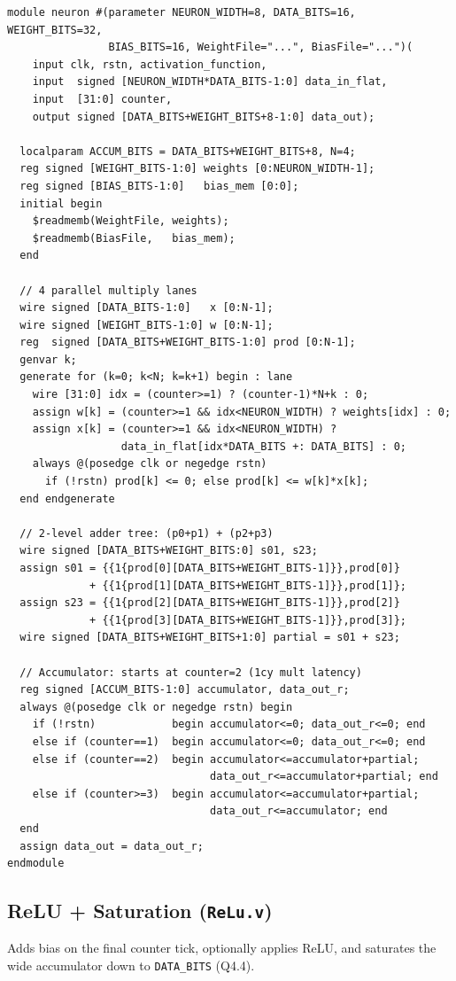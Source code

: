 \documentclass[10pt,a4paper]{article}
\begin{document}
\begin{lstlisting}
module neuron #(parameter NEURON_WIDTH=8, DATA_BITS=16, WEIGHT_BITS=32,
                BIAS_BITS=16, WeightFile="...", BiasFile="...")(
    input clk, rstn, activation_function,
    input  signed [NEURON_WIDTH*DATA_BITS-1:0] data_in_flat,
    input  [31:0] counter,
    output signed [DATA_BITS+WEIGHT_BITS+8-1:0] data_out);

  localparam ACCUM_BITS = DATA_BITS+WEIGHT_BITS+8, N=4;
  reg signed [WEIGHT_BITS-1:0] weights [0:NEURON_WIDTH-1];
  reg signed [BIAS_BITS-1:0]   bias_mem [0:0];
  initial begin
    $readmemb(WeightFile, weights);
    $readmemb(BiasFile,   bias_mem);
  end

  // 4 parallel multiply lanes
  wire signed [DATA_BITS-1:0]   x [0:N-1];
  wire signed [WEIGHT_BITS-1:0] w [0:N-1];
  reg  signed [DATA_BITS+WEIGHT_BITS-1:0] prod [0:N-1];
  genvar k;
  generate for (k=0; k<N; k=k+1) begin : lane
    wire [31:0] idx = (counter>=1) ? (counter-1)*N+k : 0;
    assign w[k] = (counter>=1 && idx<NEURON_WIDTH) ? weights[idx] : 0;
    assign x[k] = (counter>=1 && idx<NEURON_WIDTH) ?
                  data_in_flat[idx*DATA_BITS +: DATA_BITS] : 0;
    always @(posedge clk or negedge rstn)
      if (!rstn) prod[k] <= 0; else prod[k] <= w[k]*x[k];
  end endgenerate

  // 2-level adder tree: (p0+p1) + (p2+p3)
  wire signed [DATA_BITS+WEIGHT_BITS:0] s01, s23;
  assign s01 = {{1{prod[0][DATA_BITS+WEIGHT_BITS-1]}},prod[0]}
             + {{1{prod[1][DATA_BITS+WEIGHT_BITS-1]}},prod[1]};
  assign s23 = {{1{prod[2][DATA_BITS+WEIGHT_BITS-1]}},prod[2]}
             + {{1{prod[3][DATA_BITS+WEIGHT_BITS-1]}},prod[3]};
  wire signed [DATA_BITS+WEIGHT_BITS+1:0] partial = s01 + s23;

  // Accumulator: starts at counter=2 (1cy mult latency)
  reg signed [ACCUM_BITS-1:0] accumulator, data_out_r;
  always @(posedge clk or negedge rstn) begin
    if (!rstn)            begin accumulator<=0; data_out_r<=0; end
    else if (counter==1)  begin accumulator<=0; data_out_r<=0; end
    else if (counter==2)  begin accumulator<=accumulator+partial;
                                data_out_r<=accumulator+partial; end
    else if (counter>=3)  begin accumulator<=accumulator+partial;
                                data_out_r<=accumulator; end
  end
  assign data_out = data_out_r;
endmodule
\end{lstlisting}

\subsection{ReLU + Saturation (\texttt{ReLu.v})}
Adds bias on the final counter tick, optionally applies ReLU, and
saturates the wide accumulator down to \texttt{DATA\_BITS} (Q4.4).
\end{document}
